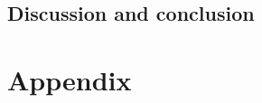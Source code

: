 \chapter{Discussion and conclusion}
%



 




\glsresetall
\appendix %

 \graphicspath{{figures/appendix/}}
\part{Appendix}\label{pt:appendix}
%



